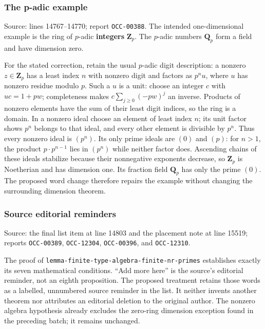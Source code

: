 \subsubsection{The p-adic example}\label{algebra-proof-004-the-p-adic-example}

Source: lines 14767--14770; report \texttt{OCC-00388}. The intended one-dimensional example is the ring of \(p\)-adic \textbf{integers} \(\mathbf Z_p\). The \(p\)-adic numbers \(\mathbf Q_p\) form a field and have dimension zero.

For the stated correction, retain the usual \(p\)-adic digit description: a nonzero \(z\in\mathbf Z_p\) has a least index \(n\) with nonzero digit and factors as \(p^n u\), where \(u\) has nonzero residue modulo \(p\). Such a \(u\) is a unit: choose an integer \(c\) with \(uc=1+pw\); completeness makes \(c\sum_{j\geq0}(-pw)^j\) an inverse. Products of nonzero elements have the sum of their least digit indices, so the ring is a domain. In a nonzero ideal choose an element of least index \(n\); its unit factor shows \(p^n\) belongs to that ideal, and every other element is divisible by \(p^n\). Thus every nonzero ideal is \((p^n)\). Its only prime ideals are \((0)\) and \((p)\): for \(n>1\), the product \(p\cdot p^{n-1}\) lies in \((p^n)\) while neither factor does. Ascending chains of these ideals stabilize because their nonnegative exponents decrease, so \(\mathbf Z_p\) is Noetherian and has dimension one. Its fraction field \(\mathbf Q_p\) has only the prime \((0)\). The proposed word change therefore repairs the example without changing the surrounding dimension theorem.

\subsubsection{Source editorial reminders}\label{algebra-proof-004-source-editorial-reminders}

Source: the final list item at line 14803 and the placement note at line 15519; reports \texttt{OCC-00389}, \texttt{OCC-12304}, \texttt{OCC-00396}, and \texttt{OCC-12310}.

The proof of \texttt{lemma-finite-type-algebra-finite-nr-primes} establishes exactly its seven mathematical conditions. ``Add more here'' is the source's editorial reminder, not an eighth proposition. The proposed treatment retains those words as a labelled, unnumbered source reminder in the list. It neither invents another theorem nor attributes an editorial deletion to the original author. The nonzero algebra hypothesis already excludes the zero-ring dimension exception found in the preceding batch; it remains unchanged.

